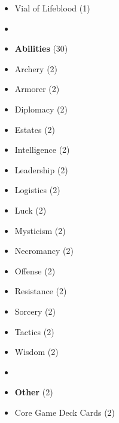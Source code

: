 \begin{multicols*}{3}
\begin{itemize}[leftmargin=0pt, label={}, noitemsep]
  \item Vial of Lifeblood (1)
  \item
  \item \textbf{Abilities} (30)
  \item Archery (2)
  \item Armorer (2)
  \item Diplomacy (2)
  \item Estates (2)
  \item Intelligence (2)
  \item Leadership (2)
  \item Logistics (2)
  \item Luck (2)
  \item Mysticism (2)
  \item Necromancy (2)
  \item Offense (2)
  \item Resistance (2)
  \item Sorcery (2)
  \item Tactics (2)
  \item Wisdom (2)
  \item
  \item \textbf{Other} (2)
  \item Core Game Deck Cards (2)
\end{itemize}

\end{multicols*}
